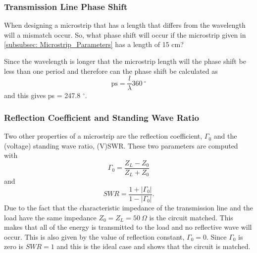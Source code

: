 \documentclass[report.tex]{subfiles}
\begin{document}
\subsubsection{Transmission Line Phase Shift}\label{subsubsec: Lab1 Phase Shift}
When designing a microstrip that has a length that differs from the wavelength will a mismatch occur. So, what phase shift will occur if the microstrip given in \ref{subsubsec: Microstrip_Parameters} has a length of 15 cm?

Since the wavelength is longer that the microstrip length will the phase shift be less than one period and therefore can the phase shift be calculated as
\begin{equation}
	\text{ps} = \dfrac{l}{\lambda} 360 \:^\circ
\end{equation}
and this gives ps = 247.8 $^\circ$.
\subsubsection{Reflection Coefficient and Standing Wave Ratio}
Two other properties of a microstrip are the reflection coefficient, $\Gamma_0$ and the (voltage) standing wave ratio, (V)SWR. These two parameters are computed with
\begin{equation}
	\Gamma_0 = \dfrac{Z_L - Z_0}{Z_L + Z_0}
\end{equation}
and
\begin{equation}
	SWR = \dfrac{1 + \left|\Gamma_0\right|}{1 - \left|\Gamma_0\right|}\text{.}
\end{equation}
Due to the fact that the characteristic impedance of the transmission line and the load have the same impedance $Z_0 = Z_L = 50\:\Omega$ is the circuit matched. This makes that all of the energy is transmitted to the load and no reflective wave will occur. This is also given by the value of reflection constant, $\Gamma_0 = 0\text{.}$ Since $\Gamma_0$ is zero is $SWR = 1$ and this is the ideal case and shows that the circuit is matched.
\end{document}
